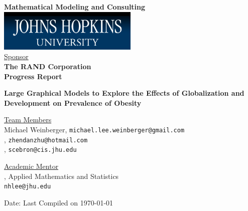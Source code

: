\documentclass[oneside,12pt]{report}
\begin{document}
\def\thefootnote{\fnsymbol{footnote}}

\thispagestyle{empty}

\def\shiftdowna{0.32in}  %
\def\shiftdownb{0.22in}  %


\begin{center}
\textbf{{\large Mathematical Modeling and Consulting }}\\

\vspace \shiftdowna
\includegraphics[width=0.5\textwidth]{jhu.png}\\

\vspace \shiftdowna
\underline {Sponsor}\\ 
\vspace{5pt}
\textbf{\large The RAND Corporation} \\
\vspace\shiftdowna
\textbf{{Progress Report}}

\vspace \shiftdowna
\textbf{{\Large Large Graphical Models to Explore the Effects of Globalization and Development on Prevalence of Obesity}}

\vspace{0.35in}
\underline {Team Members}\\

Michael Weinberger, \texttt{michael.lee.weinberger@gmail.com} \\
\vspace{3pt}
, \texttt{zhendanzhu@hotmail.com} \\
\vspace{3pt}
, \texttt{scebron@cis.jhu.edu}

\vspace \shiftdownb
\underline {Academic Mentor} \\
\vspace{5pt}
, Applied Mathematics and Statistics\\
\texttt{nhlee@jhu.edu}


\vspace \shiftdowna
Date: Last Compiled on \today

\end{center}
\end{document}
